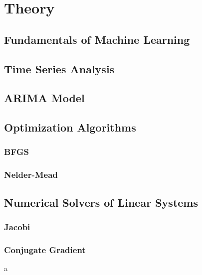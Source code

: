 \chapter{Theory}

\section{Fundamentals of Machine Learning}



\section{Time Series Analysis}
\section{ARIMA Model}
\section{Optimization Algorithms}
\subsection{BFGS}
\subsection{Nelder-Mead}
\section{Numerical Solvers of Linear Systems}
\subsection{Jacobi}
\subsection{Conjugate Gradient}a





















